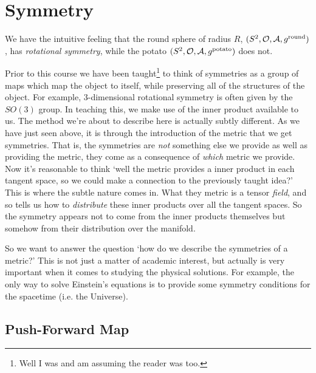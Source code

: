 \chapter{Symmetry}

We have the intuitive feeling that the round sphere of radius $R$, $(S^2,\mathcal{O},\mathcal{A},g^{\text{round}})$, has \textit{rotational symmetry}, while the potato $(S^2,\mathcal{O},\mathcal{A},g^{\text{potato}})$ does not. 

Prior to this course we have been taught\footnote{Well I was and am assuming the reader was too.} to think of symmetries as a group of maps which map the object to itself, while preserving all of the structures of the object. For example, 3-dimensional rotational symmetry is often given by the $SO(3)$ group. In teaching this, we make use of the inner product available to us. The method we're about to describe here is actually subtly different. As we have just seen above, it is through the introduction of the metric that we get symmetries. That is, the symmetries are \textit{not} something else we provide as well as providing the metric, they come as a consequence of \textit{which} metric we provide. Now it's reasonable to think `well the metric provides a inner product in each tangent space, so we could make a connection to the previously taught idea?' This is where the subtle nature comes in. What they metric is a tensor \textit{field}, and so tells us how to \textit{distribute} these inner products over all the tangent spaces. So the symmetry appears not to come from the inner products themselves but somehow from their distribution over the manifold. 

So we want to answer the question `how do we describe the symmetries of a metric?' This is not just a matter of academic interest, but actually is very important when it comes to studying the physical solutions. For example, the only way to solve Einstein's equations is to provide some symmetry conditions for the spacetime (i.e. the Universe).

\section{Push-Forward Map}

